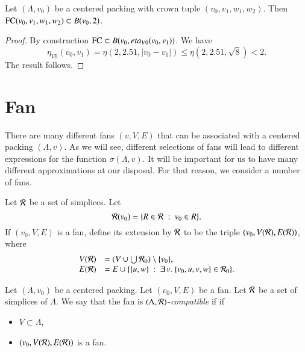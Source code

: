 \begin{lemma}
Let $(\Lambda,v_0)$ be a centered packing with crown tuple $(v_0,v_1,w_1,w_2)$.   Then
${\operatorname{FC}}(v_0,v_1,w_1,w_2)\subset B(v_0,2)$.
\end{lemma}

\begin{proof}
By construction ${\operatorname{FC}}\subset B(v_0,eta_{V0}(v_0,v_1))$.
We have
   $$\eta_{V0}(v_0,v_1) = \eta(2,2.51,|v_0-v_1|) \le \eta(2,2.51,\sqrt8) < 2.$$
The result follows.
\end{proof}







\section{Fan}

There are many different fans $(v,V,E)$ that
can be associated with a centered packing $(\Lambda,v)$.
As we will see, different selections of fans
will lead to different expressions for the function $\sigma(\Lambda,v)$.
It will be important for us to have many different approximations
at our disposal.  For that reason, we consider a number of
fans.  

\begin{definition}[extension]\label{def:extension}
Let ${\mathcal R}$ be a set of simplices.   Let 
$${\mathcal R}(v_0) = \{R \in{\mathcal R} \ :\  v_0\in R\}.$$
If $(v_0,V,E)$ is a fan, define its extension by ${\mathcal R}$ to be
the triple $(v_0,V({\mathcal R}),E({\mathcal R}))$, where
$$
\begin{array}{lll}
V({\mathcal R}) &= (V \cup \bigcup {\mathcal R}_0) \setminus \{v_0\},\\
E({\mathcal R}) &= E \cup \{\{u,w\} \ :\  \exists\, v.\ \{v_0,u,v,w\}\in {\mathcal R}_0\}.
\end{array}
$$
\end{definition}

\begin{definition}[compatible]\label{def:compatible}
Let $(\Lambda,v_0)$ be a centered packing.
Let $(v_0,V,E)$ be a fan.  Let ${\mathcal R}$ be a set of simplices of $\Lambda$.  
We say that the fan is
$(\Lambda,{\mathcal R})$-{\it compatible} if
if 
\begin{itemize}
\item
 $V\subset \Lambda$, 
\item $(v_0,V({\mathcal R}),E({\mathcal R}))$ is a fan.
\end{itemize}
\end{definition}

